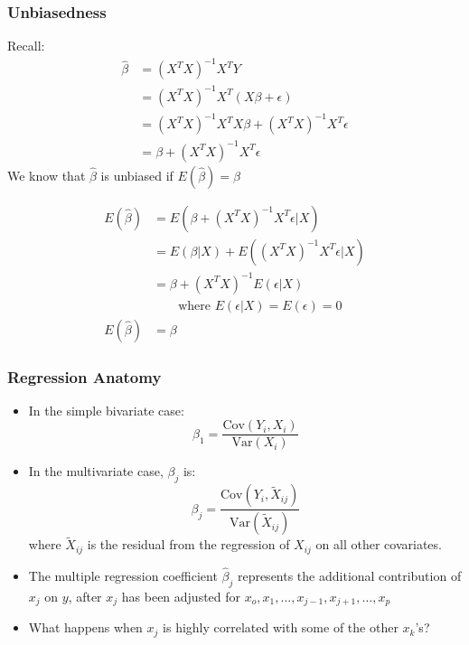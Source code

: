 \documentclass{beamer}
\begin{document}
\begin{frame}[t]\frametitle{Unbiasedness}
	Recall:
	\begin{align*}
	 \hat{\beta} &= (X^{T}X)^{-1}X^{T}Y\\
				 &= (X^{T}X)^{-1}X^{T}(X\beta + \epsilon) \\
				 &= (X^{T}X)^{-1}X^{T}X\beta + (X^{T}X)^{-1}X^{T}\epsilon \\
				 &= \beta + (X^{T}X)^{-1}X^{T}\epsilon 
	\end{align*}
	We know that $\hat{\beta}$ is unbiased if $E (\hat{\beta}) = \beta$

	\[ \begin{array}{rl}
	E (\hat{\beta}) &= E(\beta + (X^{T}X)^{-1}X^{T}\epsilon | X) \\
	 &= E(\beta | X) + E((X^{T}X)^{-1}X^{T}\epsilon | X) \\
	 &= \beta + (X^{T}X)^{-1} E(\epsilon | X) \\
	 &\qquad \text{where } E(\epsilon | X) = E(\epsilon) = 0 \\
	E (\hat{\beta}) &= \beta 
	\end{array} \]
\end{frame}

\begin{frame}[t]\frametitle{Regression Anatomy}
	\begin{itemize}
		\item<+-> In the simple bivariate case:
		 $$\beta_1=\frac{\textrm{Cov}(Y_i,X_i)}{\textrm{Var}(X_i)}$$
		 \item<+-> In the multivariate case, $\beta_j$ is:
		$$\beta_j=\frac{\textrm{Cov}(Y_i,\tilde{X}_{ij})}{\textrm{Var}(\tilde{X}_{ij})}$$
		where $\tilde{X}_{ij}$ is the residual from the regression of $X_{ij}$ on all other covariates.
		\item<+-> The multiple regression coefficient $\hat \beta_j$ represents the additional contribution of $x_j$ on $y$, after $x_j$ has been adjusted for $x_o, x_1, \dots, x_{j-1}, x_{j+1}, \dots, x_p$ 
		\item<+-> What happens when $x_j$ is highly correlated with some of the other $x_k$'s?
	\end{itemize}
\end{frame}
\end{document}
